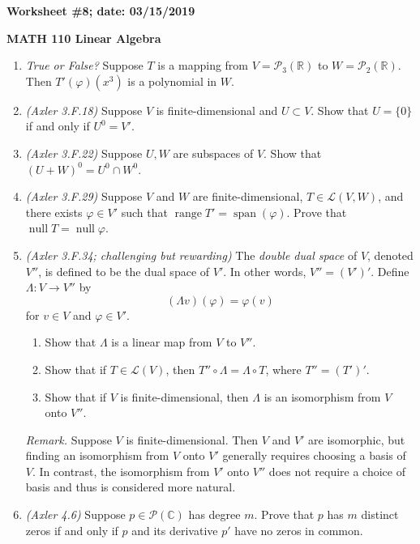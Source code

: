 \documentclass{article}
\newcommand{\RR}{\mathbb{R}}
\newcommand{\CC}{\mathbb{C}}
\newcommand{\cL}{\mathcal{L}}
\DeclareMathOperator*{\opnull}{null}
\DeclareMathOperator*{\range}{range}
\DeclareMathOperator*{\opspan}{span}
\begin{document}
{\bf Worksheet \#8; date: 03/15/2019}

{\bf MATH 110 Linear Algebra}

\begin{enumerate}
\item {\em True or False?} Suppose $T$ is a mapping from $V = \mathcal{P}_3(\RR)$ to $W = \mathcal{P}_2(\RR)$. Then $T'(\varphi)(x^3)$ is a polynomial in $W$.

\item {\em (Axler 3.F.18)} Suppose $V$ is finite-dimensional and $U \subset V$. Show that $U = \{0\}$ if and only if $U^0 = V'$.

\item {\em (Axler 3.F.22)} Suppose $U, W$ are subspaces of $V$. Show that $(U+W)^0 = U^0 \cap W^0$.

\item {\em (Axler 3.F.29)} Suppose $V$ and $W$ are finite-dimensional, $T \in \cL(V, W)$, and there exists $\varphi \in V'$ such that $\range T' = \opspan(\varphi)$. Prove that $\opnull T = \opnull \varphi$.

\item {\em (Axler 3.F.34; challenging but rewarding)} The {\em double dual space} of $V$, denoted $V''$, is defined to be the dual space of $V'$. In other words, $V'' = (V')'$. Define $\Lambda:V \to V''$ by
\[
	(\Lambda v)(\varphi) = \varphi(v)
\]
for $v \in V$ and $\varphi \in V'$.
\begin{enumerate}
	\item Show that $\Lambda$ is a linear map from $V$ to $V''$.
	\item Show that if $T \in \cL(V)$, then $T'' \circ \Lambda = \Lambda \circ T$, where $T'' = (T')'$.
	\item Show that if $V$ is finite-dimensional, then $\Lambda$ is an isomorphism from $V$ onto $V''$.
\end{enumerate}

{\em Remark.} Suppose $V$ is finite-dimensional. Then $V$ and $V'$ are isomorphic, but finding an isomorphism from $V$ onto $V'$ generally requires choosing a basis of $V$. In contrast, the isomorphism from $V'$ onto $V''$ does not require a choice of basis and thus is considered more natural.

\item {\em (Axler 4.6)} Suppose $p \in \mathcal{P}(\CC)$ has degree $m$. Prove that $p$ has $m$ distinct zeros if and only if $p$ and its derivative $p'$ have no zeros in common.
\end{enumerate}
\end{document}
